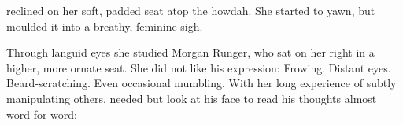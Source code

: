 \begin{comment}
\section{\Takestsha{}}
\end{comment}
\begin{comment}
\Takestsha{} is sitting in a howdah on a great \mulgron. 
She is in the royal howdah that also carries the king. 
The rest of the \ishrah{} are on some other \mulgrons{} nearby. 

\Takestsha{} is sitting with the king. 
She knows he is having second thoughts about this alliance. 
She can read the horror in his eyes, the guilt over the gruesome, unnatural carnage their mages have wrought. 
\tho{This little king is not as strong as I hoped.}
She comforts him, convinces him that he is doing the right thing. 

She uses her sexuality. 
Morgan, of course, being king, can have any number of young and beautiful women he wants, but none of them have \Takestshaz{} power. 

Somehow she notices Archibald Curwen. Or maybe it's Carzain she notices because he does something stupid. 

Maybe Curwen-tachi are camping out in a new village, hoping the Rungerans will come by and destroy the village using their evil magic. 
Or maybe they are out in the \Wylde{} and she just notices them because that's how good she is. 

Or maybe Vizicar stirs awake for a moment, creating a \vertex{} spike that she picks up. 

In her most sexy voice, she tells the king she has discovered some troublemakers and needs to send soldiers out to whoop their butts. 
\end{comment}
\Takestsha{} reclined on her soft, padded seat atop the \mulgron{} howdah. 
She started to yawn, but moulded it into a breathy, feminine sigh. 


Through languid eyes she studied Morgan Runger, who sat on her right in a higher, more ornate seat. 
She did not like his expression: 
Frowing. 
Distant eyes. 
Beard-scratching. 
Even occasional mumbling. 
With her long experience of subtly manipulating others, \Takestsha{} needed but look at his face to read his thoughts almost word-for-word: 

  
